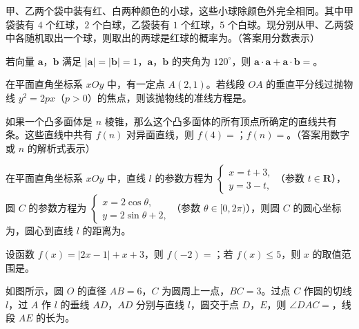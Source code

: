 \begin{question}
甲、乙两个袋中装有红、白两种颜色的小球，这些小球除颜色外完全相同。其中甲袋装有 $4$ 个红球，$2$ 个白球，乙袋装有 $1$ 个红球，$5$ 个白球。现分别从甲、乙两袋中各随机取出一个球，则取出的两球是红球的概率为\gkblank{}。（答案用分数表示）

\end{question}
\begin{question}
若向量 $\boldsymbol a$，$\boldsymbol b$ 满足 $|\boldsymbol a|=|\boldsymbol b|=1$，$\boldsymbol a$，$\boldsymbol b$ 的夹角为 $120^\circ$，则 $\boldsymbol a\cdot\boldsymbol a+\boldsymbol a\cdot\boldsymbol b=$\gkblank{}。

\end{question}
\begin{question}
在平面直角坐标系 $xOy$ 中，有一定点 $A(2,1)$。若线段 $OA$ 的垂直平分线过抛物线 $y^2=2px$（$p>0$）的焦点，则该抛物线的准线方程是\gkblank{}。

\Needspace{0.4\textheight}
\end{question}
\begin{question}
如果一个凸多面体是 $n$ 棱锥，那么这个凸多面体的所有顶点所确定的直线共有\gkblank{}条。这些直线中共有 $f(n)$ 对异面直线，则 $f(4)=$\gkblank{}；$f(n)=$\gkblank{}。（答案用数字或 $n$ 的解析式表示）
\nopagebreak[4]
\begin{center}\end{center}
\nopagebreak[4]
\end{question}
\begin{question}
在平面直角坐标系 $xOy$ 中，直线 $l$ 的参数方程为 $\begin{cases}x=t+3,\\ y=3-t,\end{cases}$（参数 $t\in\mathbf R$），圆 $C$ 的参数方程为 $\begin{cases}x=2\cos\theta,\\ y=2\sin\theta+2,\end{cases}$（参数 $\theta\in[0,2\pi)$），则圆 $C$ 的圆心坐标为\gkblank{}，圆心到直线 $l$ 的距离为\gkblank{}。

\end{question}
\begin{question}
设函数 $f(x)=|2x-1|+x+3$，则 $f(-2)=$\gkblank{}；若 $f(x)\leqslant5$，则 $x$ 的取值范围是\gkblank{}。

\Needspace{0.4\textheight}
\end{question}
\begin{question}
如图所示，圆 $O$ 的直径 $AB=6$，$C$ 为圆周上一点，$BC=3$。过点 $C$ 作圆的切线 $l$，过 $A$ 作 $l$ 的垂线 $AD$，$AD$ 分别与直线 $l$，圆交于点 $D$，$E$，则 $\angle DAC=$\gkblank{}，线段 $AE$ 的长为\gkblank{}。
\nopagebreak[4]
\begin{center}\end{center}
\nopagebreak[4]
\end{question}

